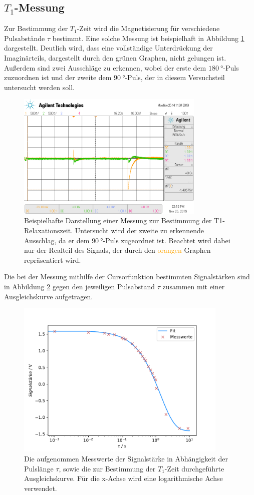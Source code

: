 \subsection{$T_1$-Messung}
Zur Bestimmung der $T_1$-Zeit wird die Magnetisierung für verschiedene Pulsabstände $\tau$ bestimmt. 
Eine solche Messung ist beispielhaft in Abbildung \ref{fig:t1} dargestellt. Deutlich wird, dass eine vollständige Unterdrückung
der Imaginärteils, dargestellt durch den grünen Graphen, nicht gelungen ist. Außerdem sind zwei Ausschläge zu erkennen, wobei der 
erste dem $\SI{180}{\degree}$-Puls zuzuordnen ist und der zweite dem $\SI{90}{\degree}$-Puls, der in diesem 
Versuchsteil untersucht werden soll.
\begin{figure}[H]
  \centering
  \includegraphics[width=0.8\textwidth]{../data/T1.png}
  \caption{Beispielhafte Darstellung einer Messung zur Bestimmung der T1-Relaxationszeit. Untersucht wird der zweite zu 
  erkennende Ausschlag, da er dem $\SI{90}{\degree}$-Puls zugeordnet ist. Beachtet wird dabei nur der Realteil des Signals, 
  der durch den \textcolor{orange}{orangen} Graphen repräsentiert wird.}
  \label{fig:t1}
\end{figure} \noindent
Die bei der Messung mithilfe der Cursorfunktion bestimmten Signalstärken sind in Abbildung \ref{fig:t1_fit} gegen den
jeweiligen Pulsabstand $\tau$ zusammen mit einer Ausgleichskurve aufgetragen. 
\begin{figure}[H]
  \centering
  \includegraphics[width=0.9\textwidth]{../Auswertung/t1_fit.pdf}
  \caption{Die aufgenommen Messwerte der Signalstärke in Abhängigkeit der Pulslänge $\tau$, sowie die 
  zur Bestimmung der $T_1$-Zeit durchgeführte Ausgleichskurve. Für die x-Achse wird eine 
  logarithmische Achse verwendet.}
  \label{fig:t1_fit}
\end{figure}
